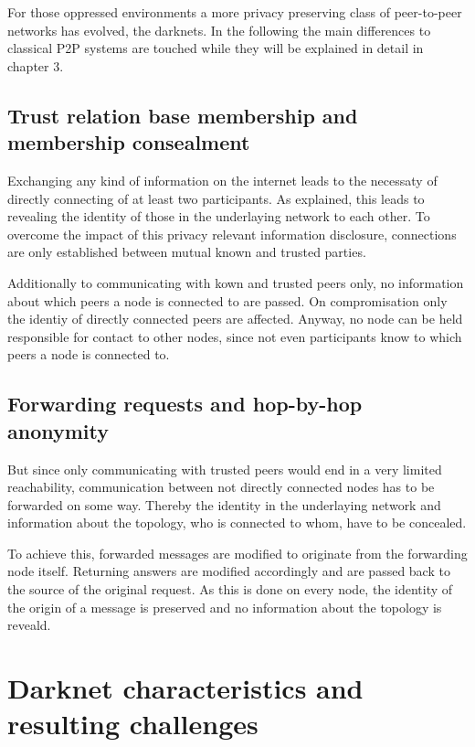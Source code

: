 For those oppressed environments a more privacy preserving class of peer-to-peer networks has evolved, the darknets. In the following the main differences to classical P2P systems are touched while they will be explained in detail in chapter 3.


\subsection{Trust relation base membership and membership consealment}

Exchanging any kind of information on the internet leads to the necessaty of directly connecting of at least two participants. As explained, this leads to revealing the identity of those in the underlaying network to each other. To overcome the impact of this privacy relevant information disclosure, connections are only established between mutual known and trusted parties.

Additionally to communicating with kown and trusted peers only, no information about which peers a node is connected to are passed. On compromisation only the identiy of directly connected peers are affected. Anyway, no node can be held responsible for contact to other nodes, since not even participants know to which peers a node is connected to.

\subsection{Forwarding requests and hop-by-hop anonymity}

But since only communicating with trusted peers would end in a very limited reachability, communication between not directly connected nodes has to be forwarded on some way. Thereby the identity in the underlaying network and information about the topology, who is connected to whom, have to be concealed.

To achieve this, forwarded messages are modified to originate from the forwarding node itself. Returning answers are modified accordingly and are passed back to the source of the original request. As this is done on every node, the identity of the origin of a message is preserved and no information about the topology is reveald.


\section{Darknet characteristics and resulting challenges}

